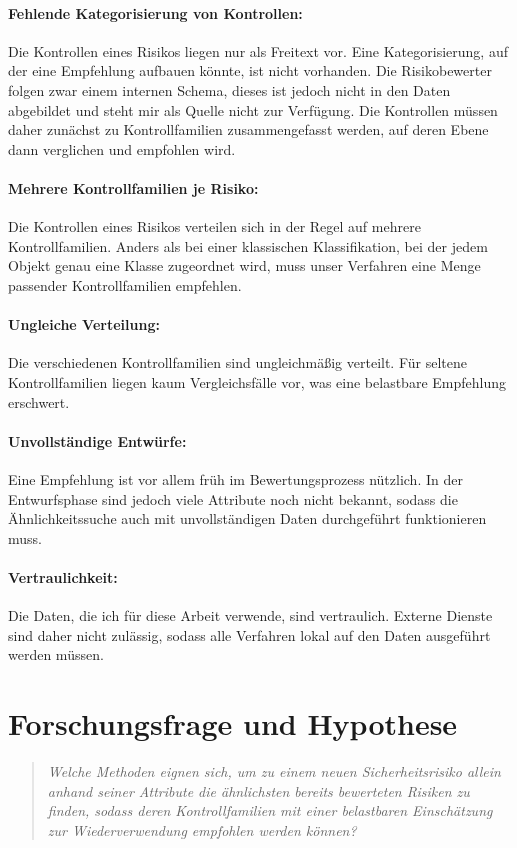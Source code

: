 \paragraph{Fehlende Kategorisierung von Kontrollen:}
Die Kontrollen eines Risikos liegen nur als Freitext vor.
Eine Kategorisierung, auf der eine Empfehlung aufbauen könnte, ist nicht vorhanden.
Die Risikobewerter folgen zwar einem internen Schema, dieses ist jedoch nicht in den Daten abgebildet und steht mir als Quelle nicht zur Verfügung.
Die Kontrollen müssen daher zunächst zu Kontrollfamilien zusammengefasst werden, auf deren Ebene dann verglichen und empfohlen wird.

\paragraph{Mehrere Kontrollfamilien je Risiko:}
Die Kontrollen eines Risikos verteilen sich in der Regel auf mehrere Kontrollfamilien.
Anders als bei einer klassischen Klassifikation, bei der jedem Objekt genau eine Klasse zugeordnet wird, muss unser Verfahren eine Menge passender Kontrollfamilien empfehlen.

\paragraph{Ungleiche Verteilung:}
Die verschiedenen Kontrollfamilien sind ungleichmäßig verteilt.
Für seltene Kontrollfamilien liegen kaum Vergleichsfälle vor, was eine belastbare Empfehlung erschwert.

\paragraph{Unvollständige Entwürfe:}
Eine Empfehlung ist vor allem früh im Bewertungsprozess nützlich.
In der Entwurfsphase sind jedoch viele Attribute noch nicht bekannt, sodass die Ähnlichkeitssuche auch mit unvollständigen Daten durchgeführt funktionieren muss.

\paragraph{Vertraulichkeit:}
Die Daten, die ich für diese Arbeit verwende, sind vertraulich.
Externe Dienste sind daher nicht zulässig, sodass alle Verfahren lokal auf den Daten ausgeführt werden müssen.

\section{Forschungsfrage und Hypothese}\label{sec:forschungsfrage}
\begin{quote}
  \itshape Welche Methoden eignen sich, um zu einem neuen Sicherheitsrisiko
  allein anhand seiner Attribute die ähnlichsten bereits bewerteten Risiken zu
  finden, sodass deren Kontrollfamilien mit einer belastbaren Einschätzung zur Wiederverwendung empfohlen werden können?
\end{quote}


